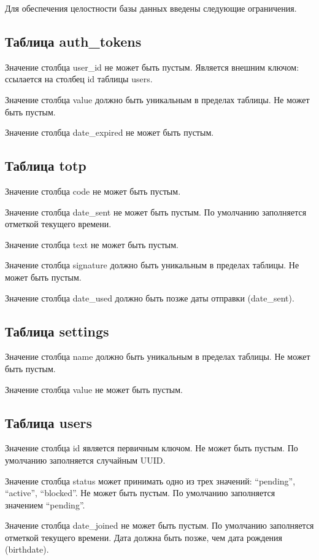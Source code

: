 Для обеспечения целостности базы данных введены следующие ограничения.

\subsection{Таблица auth\_tokens}

Значение столбца user\_id не может быть пустым. Является внешним ключом: ссылается на столбец id таблицы users.

Значение столбца value должно быть уникальным в пределах таблицы. Не может быть пустым.

Значение столбца date\_expired не может быть пустым.

\subsection{Таблица totp}

Значение столбца code не может быть пустым.

Значение столбца date\_sent не может быть пустым. По умолчанию заполняется отметкой текущего времени.

Значение столбца text не может быть пустым.

Значение столбца signature должно быть уникальным в пределах таблицы. Не может быть пустым.

Значение столбца date\_used должно быть позже даты отправки (date\_sent).

\subsection{Таблица settings}

Значение столбца name должно быть уникальным в пределах таблицы. Не может быть пустым.

Значение столбца value не может быть пустым.

\subsection{Таблица users}

Значение столбца id является первичным ключом. Не может быть пустым. По умолчанию заполняется случайным UUID.

Значение столбца status может принимать одно из трех значений: \enquote{pending}, \enquote{active}, \enquote{blocked}. Не может быть пустым. По умолчанию заполняется значением \enquote{pending}.

Значение столбца date\_joined не может быть пустым. По умолчанию заполняется отметкой текущего времени. Дата должна быть позже, чем дата рождения (birthdate).


